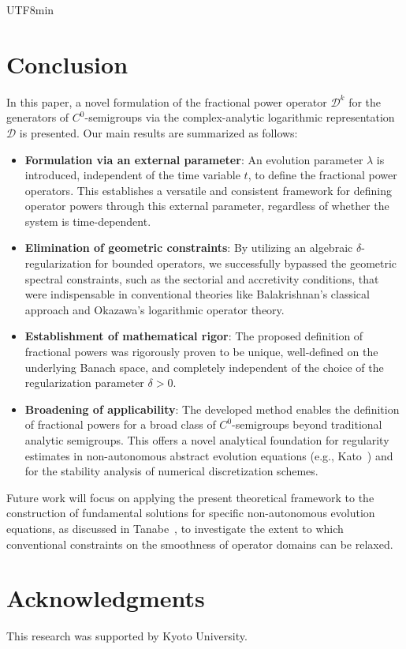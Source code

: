 \documentclass[10pt,a4paper]{article}
\theoremstyle{definition}
\theoremstyle{remark}
\begin{document}
\begin{CJK}{UTF8}{min}
\section{Conclusion}
In this paper, a novel formulation of the fractional power operator $\mathcal{D}^k$ for the generators of $C^0$-semigroups via the complex-analytic logarithmic representation $\mathcal{D}$ is presented. 
Our main results are summarized as follows:
\begin{itemize}
\item \textbf{Formulation via an external parameter}: An evolution parameter $\lambda$ is introduced, independent of the time variable $t$, to define the fractional power operators. 
This establishes a versatile and consistent framework for defining operator powers through this external parameter, regardless of whether the system is time-dependent.
\item \textbf{Elimination of geometric constraints}: By utilizing an algebraic $\delta$-regularization for bounded operators, we successfully bypassed the geometric spectral constraints, such as the sectorial and accretivity conditions, that were indispensable in conventional theories like Balakrishnan's classical approach and Okazawa's logarithmic operator theory.
\item \textbf{Establishment of mathematical rigor}: The proposed definition of fractional powers was rigorously proven to be unique, well-defined on the underlying Banach space, and completely independent of the choice of the regularization parameter $\delta > 0$.
\item \textbf{Broadening of applicability}: The developed method enables the definition of fractional powers for a broad class of $C^0$-semigroups beyond traditional analytic semigroups. This offers a novel analytical foundation for regularity estimates in non-autonomous abstract evolution equations (e.g., Kato~\cite{93kato}) and for the stability analysis of numerical discretization schemes.
\end{itemize}
Future work will focus on applying the present theoretical framework to the construction of fundamental solutions for specific non-autonomous evolution equations, as discussed in Tanabe~\cite{79tanabe}, to investigate the extent to which conventional constraints on the smoothness of operator domains can be relaxed.

\section*{Acknowledgments}
This research was supported by Kyoto University.




\end{CJK}
\end{document}
